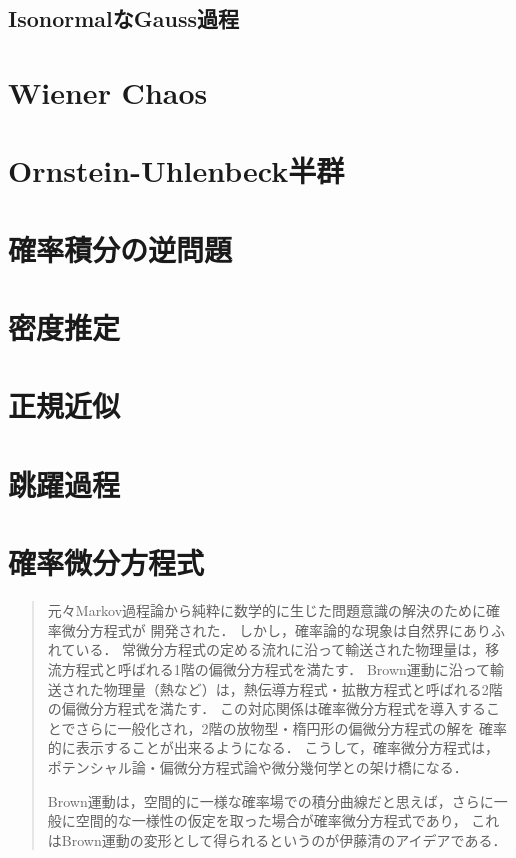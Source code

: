 \documentclass[uplatex,dvipdfmx]{jsreport}
\begin{document}
\section{IsonormalなGauss過程}

\chapter{Wiener Chaos}

\chapter{Ornstein-Uhlenbeck半群}

\chapter{確率積分の逆問題}

\chapter{密度推定}

\chapter{正規近似}

\chapter{跳躍過程}

\chapter{確率微分方程式}

\begin{quotation}
    元々Markov過程論から純粋に数学的に生じた問題意識の解決のために確率微分方程式が
    開発された．
    しかし，確率論的な現象は自然界にありふれている．
    常微分方程式の定める流れに沿って輸送された物理量は，移流方程式と呼ばれる1階の偏微分方程式を満たす．
    Brown運動に沿って輸送された物理量（熱など）は，熱伝導方程式・拡散方程式と呼ばれる2階の偏微分方程式を満たす．
    この対応関係は確率微分方程式を導入することでさらに一般化され，2階の放物型・楕円形の偏微分方程式の解を
    確率的に表示することが出来るようになる．
    こうして，確率微分方程式は，ポテンシャル論・偏微分方程式論や微分幾何学との架け橋になる．

    Brown運動は，空間的に一様な確率場での積分曲線だと思えば，さらに一般に空間的な一様性の仮定を取った場合が確率微分方程式であり，
    これはBrown運動の変形として得られるというのが伊藤清のアイデアである．
\end{quotation}
\end{document}
